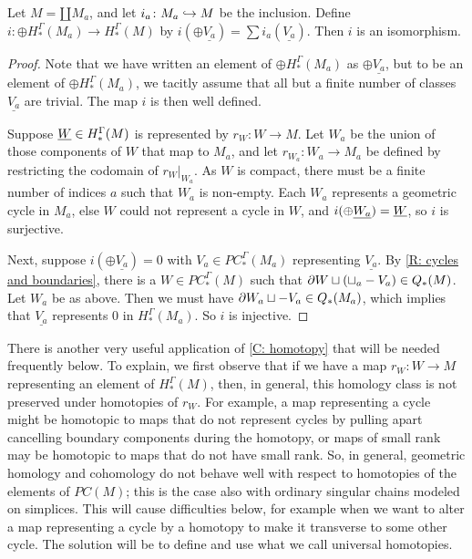 \begin{proposition}\label{P: additive h}
Let $M = \amalg{M_a}$, and let $i_a \colon M_a \hookrightarrow M$ be the inclusion.
Define $i \colon \oplus H_*^\Gamma(M_a) \to H_*^\Gamma(M)$ by $i(\oplus \underline{V_a}) = \sum i_a(\underline{V_a})$.
Then $i$ is an isomorphism.
\end{proposition}
\begin{proof}
Note that we have written an element of $\oplus H_*^\Gamma(M_a)$ as $\oplus \underline{V_a}$, but to be an element of $\oplus H_*^\Gamma(M_a)$, we tacitly assume that all but a finite number of classes $\underline{V_a}$ are trivial.
The map $i$ is then well defined.

Suppose $\underline{W} \in  H_*^\Gamma(M)$ is represented by $r_W \colon W \to M$.
Let $W_a$ be the union of those components of $W$ that map to $M_a$, and let $r_{W_a} \colon W_a \to M_a$ be defined by restricting the codomain of $r_W|_{W_a}$.
As $W$ is compact, there must be a finite number of indices $a$ such that $W_a$ is non-empty.
Each $W_a$ represents a geometric cycle in $M_a$, else $W$ could not represent a cycle in $W$, and $i(\oplus \underline{W_a}) = \underline{W}$, so $i$ is surjective.

Next, suppose $i(\oplus \underline{V_a})=0$ with $V_a \in PC_*^\Gamma(M_a)$ representing $\underline{V_a}$.
By \cref{R: cycles and boundaries}, there is a $W \in PC_*^\Gamma(M)$ such that $\partial W \sqcup (\sqcup_a -V_a) \in Q_*(M)$.
Let $W_a$ be as above.
Then we must have $\partial W_a \sqcup -V_a \in Q_*(M_a)$, which implies that $\underline{V_a}$ represents $0$ in $H_*^\Gamma(M_a)$.
So $i$ is injective.
\end{proof}

There is another very useful application of \cref{C: homotopy} that will be needed frequently below.
To explain, we first observe that if we have a map $r_W \colon W \to M$ representing an element of $H_*^\Gamma(M)$, then, in general, this homology class is not preserved under homotopies of $r_W$.
For example, a map representing a cycle might be homotopic to maps that do not represent cycles by pulling apart cancelling boundary components during the homotopy, or maps of small rank may be homotopic to maps that do not have small rank.
So, in general, geometric homology and cohomology do not behave well with respect to homotopies of the elements of $PC(M)$; this is the case also with ordinary singular chains modeled on simplices.
This will cause difficulties below, for example when we want to alter a map representing a cycle by a homotopy to make it transverse to some other cycle.
The solution will be to define and use what we call universal homotopies.


